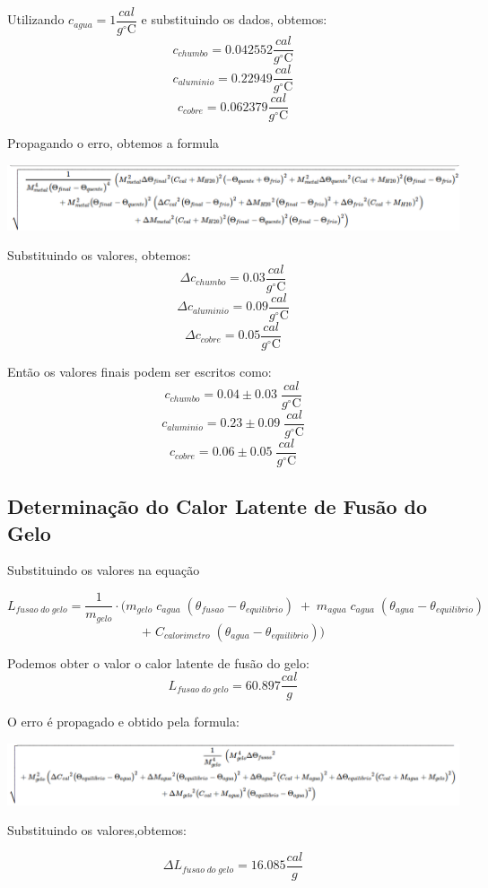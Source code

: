 \documentclass[12pt,a4paper]{article}
\begin{document}
Utilizando $c_{agua} = 1 \dfrac{cal}{g^{\circ}\mathrm{C}}$ e substituindo os dados, obtemos:
$$ c_{chumbo} = 0.042552 \dfrac{cal}{g^{\circ}\mathrm{C}}$$
$$ c_{aluminio} = 0.22949 \dfrac{cal}{g^{\circ}\mathrm{C}}$$
$$ c_{cobre} = 0.062379 \dfrac{cal}{g^{\circ}\mathrm{C}}$$

\newpage
Propagando o erro, obtemos a formula 

\includegraphics[scale=0.45]{formula.png}

Substituindo os valores, obtemos:
$$ \Delta c_{chumbo} = 0.03 \dfrac{cal}{g^{\circ}\mathrm{C}}$$
$$ \Delta c_{aluminio} = 0.09 \dfrac{cal}{g^{\circ}\mathrm{C}}$$
$$ \Delta c_{cobre} = 0.05 \dfrac{cal}{g^{\circ}\mathrm{C}}$$

Então os valores finais podem ser escritos como:
$$ c_{chumbo} = 0.04 \pm 0.03 \; \dfrac{cal}{g^{\circ}\mathrm{C}}$$
$$ c_{aluminio} = 0.23 \pm 0.09 \; \dfrac{cal}{g^{\circ}\mathrm{C}}$$
$$ c_{cobre} = 0.06 \pm 0.05 \; \dfrac{cal}{g^{\circ}\mathrm{C}}$$


\subsection{Determinação do Calor Latente de Fusão do Gelo}
Substituindo os valores na equação 

$$L_{fusao\;do\;gelo} = \frac{1}{m_{gelo}} \cdot (m_{gelo} \; c_{agua} \; (\theta_{fusao} - \theta_{equilibrio}) \; + \; m_{agua} \; c_{agua} \; (\theta_{agua} - \theta_{equilibrio}) \;$$ 
$$ + \; C_{calorimetro} \; (\theta_{agua} - \theta_{equilibrio}))$$

Podemos obter o valor o calor latente de fusão do gelo:
$$ L_{fusao\;do\;gelo} = 60.897 \dfrac{cal}{g}$$

O erro é propagado e obtido pela formula: 

\includegraphics[scale=0.45]{formula2.png}

Substituindo os valores,obtemos:

$$ \Delta L_{fusao\;do\;gelo} = 16.085 \dfrac{cal}{g}$$
\end{document}
